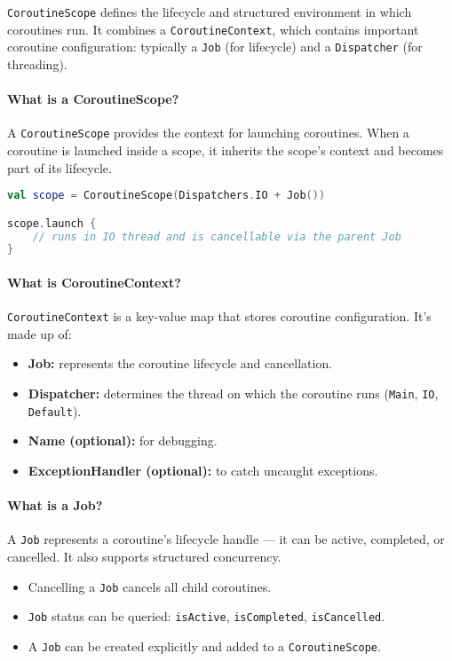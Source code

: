 \documentclass[a4paper,12pt]{article}
\begin{document}
\texttt{CoroutineScope} defines the lifecycle and structured environment in which coroutines run. It combines a \texttt{CoroutineContext}, which contains important coroutine configuration: typically a \texttt{Job} (for lifecycle) and a \texttt{Dispatcher} (for threading).

\paragraph{What is a CoroutineScope?}

A \texttt{CoroutineScope} provides the context for launching coroutines. When a coroutine is launched inside a scope, it inherits the scope's context and becomes part of its lifecycle.

\begin{lstlisting}[language=Kotlin]
val scope = CoroutineScope(Dispatchers.IO + Job())

scope.launch {
    // runs in IO thread and is cancellable via the parent Job
}
\end{lstlisting}

\paragraph{What is CoroutineContext?}

\texttt{CoroutineContext} is a key-value map that stores coroutine configuration. It's made up of:
\begin{itemize}
  \item \textbf{Job:} represents the coroutine lifecycle and cancellation.
  \item \textbf{Dispatcher:} determines the thread on which the coroutine runs (\texttt{Main}, \texttt{IO}, \texttt{Default}).
  \item \textbf{Name (optional):} for debugging.
  \item \textbf{ExceptionHandler (optional):} to catch uncaught exceptions.
\end{itemize}

\paragraph{What is a Job?}

A \texttt{Job} represents a coroutine's lifecycle handle — it can be active, completed, or cancelled. It also supports structured concurrency.

\begin{itemize}
  \item Cancelling a \texttt{Job} cancels all child coroutines.
  \item \texttt{Job} status can be queried: \texttt{isActive}, \texttt{isCompleted}, \texttt{isCancelled}.
  \item A \texttt{Job} can be created explicitly and added to a \texttt{CoroutineScope}.
\end{itemize}
\end{document}
